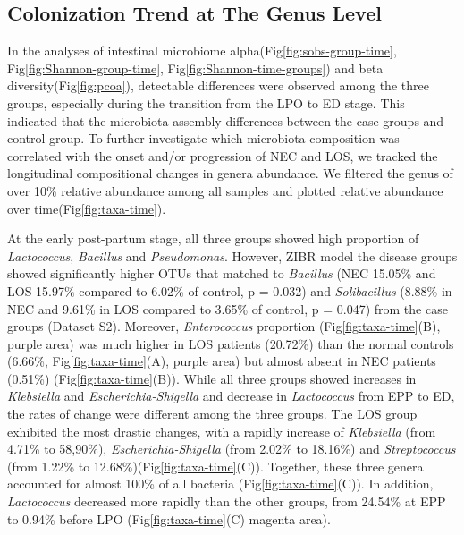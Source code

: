 \documentclass[fleqn,10pt, lineno]{wlpeerj} %
\begin{document}

  \subsection*{Colonization Trend at The Genus Level}
  In the analyses of intestinal microbiome alpha(Fig\ref{fig:sobs-group-time}, Fig\ref{fig:Shannon-group-time}, Fig\ref{fig:Shannon-time-groups}) and beta diversity(Fig\ref{fig:pcoa}), detectable differences were observed among the three groups, especially during the transition from the LPO to ED stage.  This indicated that the microbiota assembly differences between the case groups and control group. To further investigate which microbiota composition was correlated with the onset and/or progression of NEC and LOS, we tracked the longitudinal compositional changes in genera abundance. We filtered the genus of over 10\% relative abundance among all samples and plotted relative abundance over time(Fig\ref{fig:taxa-time}).

    At the early post-partum stage, all three groups showed high proportion of \textit{Lactococcus}, \textit{Bacillus} and \textit{Pseudomonas}. However, ZIBR model the disease groups showed significantly higher OTUs that matched to \textit{Bacillus} (NEC 15.05\% and LOS 15.97\% compared to 6.02\% of control, p = 0.032) and \textit{Solibacillus} (8.88\% in NEC and 9.61\% in LOS compared to 3.65\% of control, p = 0.047) from the case groups (Dataset S2). Moreover, \textit{Enterococcus} proportion (Fig\ref{fig:taxa-time}(B), purple area) was much higher in LOS patients (20.72\%) than the normal controls (6.66\%, Fig\ref{fig:taxa-time}(A), purple area) but almost absent in NEC patients (0.51\%) (Fig\ref{fig:taxa-time}(B)).  While all three groups showed increases in \textit{Klebsiella} and \textit{Escherichia-Shigella} and decrease in \textit{Lactococcus} from EPP to ED, the rates of change were different among the three groups.  The LOS group exhibited the most drastic changes, with a rapidly increase of \textit{Klebsiella} (from 4.71\% to 58,90\%), \textit{Escherichia-Shigella} (from 2.02\% to 18.16\%) and \textit{Streptococcus} (from 1.22\% to 12.68\%)(Fig\ref{fig:taxa-time}(C)).  Together, these three genera accounted for almost 100\% of all bacteria (Fig\ref{fig:taxa-time}(C)). In addition, \textit{Lactococcus} decreased more rapidly than the other groups, from 24.54\% at EPP to 0.94\% before LPO (Fig\ref{fig:taxa-time}(C) magenta area).
\end{document}
